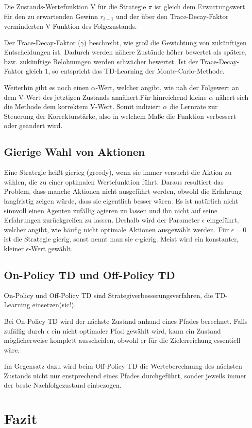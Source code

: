 \documentclass[10pt]{scrartcl}
\begin{document}
Die Zustands-Wertefunktion V für die Strategie $\pi$ ist gleich dem Erwartungswert für den zu erwartenden Gewinn $r_{t+1}$ und der über den Trace-Decay-Faktor verminderten V-Funktion des Folgezustands.

Der Trace-Decay-Faktor ($\gamma$) beschreibt, wie groß die Gewichtung von zukünftigen Entscheidungen ist. Dadurch werden nähere Zustände höher bewertet als spätere, bzw. zukünftige Belohnungen werden schwächer bewertet. Ist der Trace-Decay-Faktor  gleich 1, so entspricht das TD-Learning der Monte-Carlo-Methode.

Weiterhin gibt es noch einen $\alpha$-Wert, welcher angibt, wie nah der Folgewert an dem V-Wert des jetztigen Zustands annähert.Für hinreichend kleine $\alpha$ nähert sich die Methode dem korrektem V-Wert. Somit indiziert $\alpha$ die Lernrate zur Steuerung der Korrekturstärke, also in welchem Maße die Funktion verbessert oder geändert wird.

\subsection{Gierige Wahl von Aktionen}
Eine Strategie heißt gierieg (greedy), wenn sie immer versucht die Aktion zu wählen, die zu einer optimalen Wertefunktion führt. Daraus resultiert das Problem, dass manche Aktionen nicht ausgeführt werden, obwohl die Erfahrung langfristig zeigen würde, dass sie eigentlich besser wären. 
Es ist natürlich nicht sinnvoll einen Agenten zufällig agieren zu lassen und ihn nicht auf seine Erfahrungen zurückgreifen zu lassen. Deshalb wird der Parameter $\epsilon$ eingeführt, welcher angibt, wie häufig nicht optimale Aktionen ausgewählt werden. Für $\epsilon = 0$ ist die Strategie gierig, sonst nennt man sie $\epsilon$-gierig. Meist wird ein konstanter, kleiner $\epsilon$-Wert gewählt. 

\subsection{On-Policy TD und Off-Policy TD}
On-Policy und Off-Policy TD sind Strategiverbesserungsverfahren, die TD-Learning einsetzen(sic!).

Bei On-Policy TD wird der nächste Zustand anhand eines Pfades berechnet. Falls zufällig durch $\epsilon$ ein nicht optimaler Pfad gewählt wird, kann ein Zustand möglicherweise komplett ausscheiden, obwohl er für die Zielerreichung essentiell wäre. 

Im Gegensatz dazu wird beim Off-Policy TD die Werteberechnung des nächsten Zustands nicht nur enstprechend eines Pfades durchgeführt, sonder jeweils immer der beste Nachfolgezustand einbezogen. 


\section{Fazit}
\end{document}
